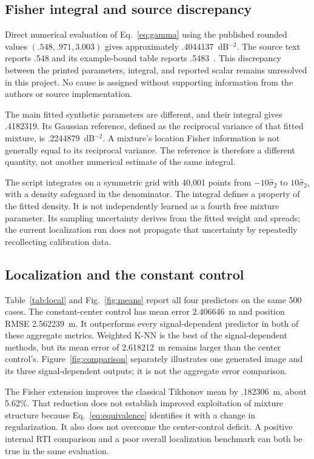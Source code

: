 \documentclass[conference,letterpaper]{IEEEtran}
\begin{document}
\subsection{Fisher integral and source discrepancy}
Direct numerical evaluation of Eq.~\eqref{eq:gamma} using the published rounded values $(.548,.971,3.003)$ gives approximately .4044137~dB$^{-2}$. The source text reports .548 and its example-bound table reports .5483~\cite{wilson2010}. This discrepancy between the printed parameters, integral, and reported scalar remains unresolved in this project. No cause is assigned without supporting information from the authors or source implementation.

The main fitted synthetic parameters are different, and their integral gives .4182319. Its Gaussian reference, defined as the reciprocal variance of that fitted mixture, is .2244879~dB$^{-2}$. A mixture's location Fisher information is not generally equal to its reciprocal variance. The reference is therefore a different quantity, not another numerical estimate of the same integral.

The script integrates on a symmetric grid with 40,001 points from $-10\widehat\sigma_2$ to $10\widehat\sigma_2$, with a density safeguard in the denominator. The integral defines a property of the fitted density. It is not independently learned as a fourth free mixture parameter. Its sampling uncertainty derives from the fitted weight and spreads; the current localization run does not propagate that uncertainty by repeatedly recollecting calibration data.

\subsection{Localization and the constant control}
Table~\ref{tab:local} and Fig.~\ref{fig:means} report all four predictors on the same 500 cases. The constant-center control has mean error 2.406646~m and position RMSE 2.562239~m. It outperforms every signal-dependent predictor in both of these aggregate metrics. Weighted K-NN is the best of the signal-dependent methods, but its mean error of 2.618212~m remains larger than the center control's. Figure~\ref{fig:comparison} separately illustrates one generated image and its three signal-dependent outputs; it is not the aggregate error comparison.

The Fisher extension improves the classical Tikhonov mean by .182306~m, about 5.62\%. That reduction does not establish improved exploitation of mixture structure because Eq.~\eqref{eq:equivalence} identifies it with a change in regularization. It also does not overcome the center-control deficit. A positive internal RTI comparison and a poor overall localization benchmark can both be true in the same evaluation.
\end{document}
